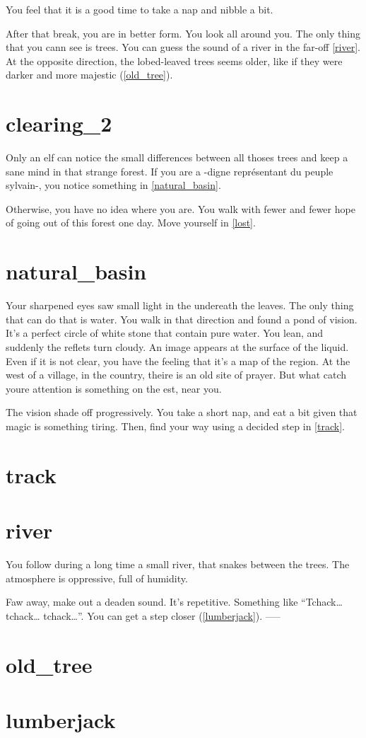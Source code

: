 You feel that it is a good time to take a nap and nibble a bit.

After that break, you are in better form. You look all around you. The only
thing that you cann see is trees. You can guess the sound of a river in the
far-off \ref{river}. At the opposite direction, the lobed-leaved trees seems
older, like if they were darker and more majestic (\ref{old_tree}).

\section{clearing_2}

Only an elf can notice the small differences between all thoses trees and keep a
sane mind in that strange forest. If you are a -digne représentant du peuple
sylvain-, you notice something in \ref{natural_basin}.

Otherwise, you have no idea where you are. You walk with fewer and fewer hope of
going out of this forest one day. Move yourself in \ref{lost}.

\section{natural_basin}

Your sharpened eyes saw small light in the undereath the leaves. The only
thing that can do that is water. You walk in that direction and found a pond
of vision. It's a perfect circle of white stone that contain pure water. You
lean, and suddenly the reflets turn cloudy. An image appears at
the surface of the liquid. Even if it is not clear, you have the feeling that
it's a map of the region. At the west of a village, in the country, theire is an
old site of prayer. But what catch youre attention is something on the est,
near you.

The vision shade off progressively. You take a short nap, and eat a bit
given that magic is something tiring. Then, find your way using a decided step
in \ref{track}.

\section{track}
\section{river}

You follow during a long time a small river, that snakes between the trees.
The atmosphere is oppressive, full of humidity.

Faw away, make out a deaden sound. It's repetitive. Something like
``Tchack… tchack… tchack…''. You can get a step closer (\ref{lumberjack}).
-----
\section{old_tree}
\section{lumberjack}
